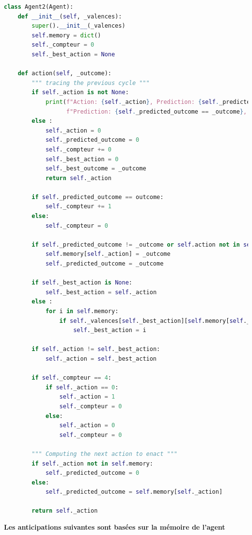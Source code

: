 \documentclass[a4paper, 12pt]{article}
\begin{document}
\begin{lstlisting}[language=Python]
    class Agent2(Agent):
    def __init__(self, _valences):
        super().__init__(_valences)
        self.memory = dict()
        self._compteur = 0
        self._best_action = None
    
    def action(self, _outcome):
        """ tracing the previous cycle """
        if self._action is not None:
            print(f"Action: {self._action}, Prediction: {self._predicted_outcome}, Outcome: {_outcome}, "
                  f"Prediction: {self._predicted_outcome == _outcome}, Valence: {self._valences[self._action][_outcome]}")
        else :
            self._action = 0
            self._predicted_outcome = 0
            self._compteur += 0
            self._best_action = 0
            self._best_outcome = _outcome
            return self._action
        
        if self._predicted_outcome == outcome:
            self._compteur += 1
        else:
            self._compteur = 0
            
        if self._predicted_outcome != _outcome or self.action not in self.memory:
            self.memory[self._action] = _outcome
            self._predicted_outcome = _outcome
            
        if self._best_action is None:
            self._best_action = self._action
        else :
            for i in self.memory:
                if self._valences[self._best_action][self.memory[self._best_action]] < self._valences[i][self.memory[i]]:
                    self._best_action = i
            
        if self._action != self._best_action:
            self._action = self._best_action
        
        if self._compteur == 4:
            if self._action == 0:
                self._action = 1
                self._compteur = 0
            else:
                self._action = 0
                self._compteur = 0
        
        """ Computing the next action to enact """
        if self._action not in self.memory:
            self._predicted_outcome = 0
        else:
            self._predicted_outcome = self.memory[self._action]
            
        return self._action
\end{lstlisting}

\bigskip

\noindent \large \textbf{Les anticipations suivantes sont basées sur la mémoire de l'agent}
\normalsize
\end{document}
